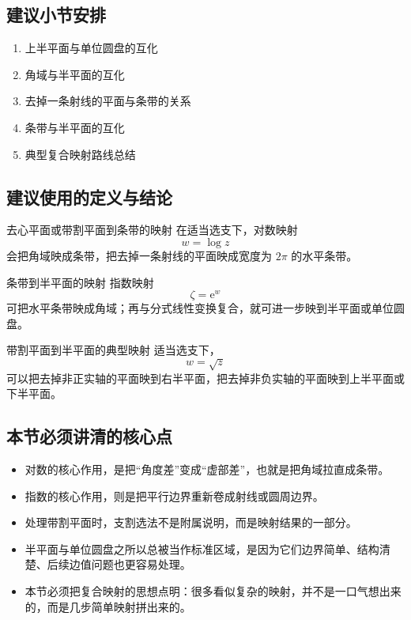 \subsection*{建议小节安排}
\begin{enumerate}
    \item 上半平面与单位圆盘的互化
    \item 角域与半平面的互化
    \item 去掉一条射线的平面与条带的关系
    \item 条带与半平面的互化
    \item 典型复合映射路线总结
\end{enumerate}

\subsection*{建议使用的定义与结论}
\begin{dingli}{去心平面或带割平面到条带的映射}{}
在适当选支下，对数映射
\[
    w=\log z
\]
会把角域映成条带，把去掉一条射线的平面映成宽度为 $2\pi$ 的水平条带。
\end{dingli}

\begin{dingli}{条带到半平面的映射}{}
指数映射
\[
    \zeta=\mathrm{e}^w
\]
可把水平条带映成角域；再与分式线性变换复合，就可进一步映到半平面或单位圆盘。
\end{dingli}

\begin{dingli}{带割平面到半平面的典型映射}{}
适当选支下，
\[
    w=\sqrt{z}
\]
可以把去掉非正实轴的平面映到右半平面，把去掉非负实轴的平面映到上半平面或下半平面。
\end{dingli}

\subsection*{本节必须讲清的核心点}
\begin{itemize}
    \item 对数的核心作用，是把``角度差''变成``虚部差''，也就是把角域拉直成条带。
    \item 指数的核心作用，则是把平行边界重新卷成射线或圆周边界。
    \item 处理带割平面时，支割选法不是附属说明，而是映射结果的一部分。
    \item 半平面与单位圆盘之所以总被当作标准区域，是因为它们边界简单、结构清楚、后续边值问题也更容易处理。
    \item 本节必须把复合映射的思想点明：很多看似复杂的映射，并不是一口气想出来的，而是几步简单映射拼出来的。
\end{itemize}

